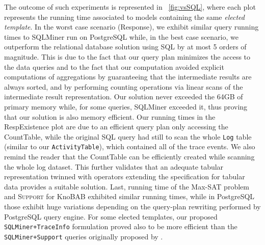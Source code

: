 The outcome of such experiments is represented in \figurename~\ref{fig:vsSQL}, where each plot represents the running time associated to models containing the same \textit{elected template}. In the worst case scenario (\textsf{Response}), we exhibit similar query running times to SQLMiner run on PostgreSQL while, in the best case scenario, we outperform the relational database solution using SQL by at most 5 orders of magnitude. This is due to the fact that our query plan minimizes the access to the data queries and to the fact that our computation avoided explicit computations of aggregations by guaranteeing that the intermediate results are always sorted, and by performing counting operations via linear scans of the intermediate result representation. Our solution never exceeded the 64GB of primary memory while, for some queries, SQLMiner exceeded it, thus proving that our solution is also memory efficient. Our running times in the \textsf{RespExistence} plot are due to an efficient query plan only accessing the  \textsf{CountTable}, while the original SQL query had still to scan the whole \texttt{Log} table (similar to our \texttt{ActivityTable}), which contained all of the trace events. We also remind the reader that the \textsf{CountTable} can be efficiently created while scanning the whole log dataset. This further validates that an adequate tabular representation twinned with \xLTLf operators extending the \LTLf specification for tabular data provides a suitable solution. Last, running time of the Max-SAT problem and \textsc{Support} for KnoBAB exhibited similar running times, while in PostgreSQL those exhibit huge variations depending on the query-plan rewriting performed by PostgreSQL query engine. For some elected templates, our proposed \texttt{SQLMiner+TraceInfo} formulation proved also to be more efficient than the \texttt{SQLMiner+Support} queries originally proposed by \cite{Schonig15}.



